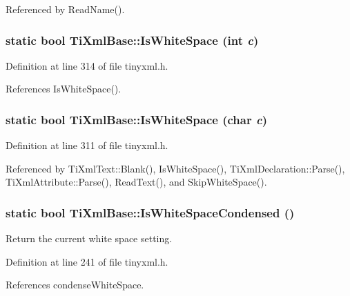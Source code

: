 Referenced by ReadName().\hypertarget{class_ti_xml_base_a3de391ea9f4c4a8aa10d04480b048795}{
\subsubsection[{IsWhiteSpace}]{\setlength{\rightskip}{0pt plus 5cm}static bool TiXmlBase::IsWhiteSpace (int {\em c})}}
\label{class_ti_xml_base_a3de391ea9f4c4a8aa10d04480b048795}


Definition at line 314 of file tinyxml.h.

References IsWhiteSpace().\hypertarget{class_ti_xml_base_af56296d561c0bab4bc8e198cdcf5c48e}{
\subsubsection[{IsWhiteSpace}]{\setlength{\rightskip}{0pt plus 5cm}static bool TiXmlBase::IsWhiteSpace (char {\em c})}}
\label{class_ti_xml_base_af56296d561c0bab4bc8e198cdcf5c48e}


Definition at line 311 of file tinyxml.h.

Referenced by TiXmlText::Blank(), IsWhiteSpace(), TiXmlDeclaration::Parse(), TiXmlAttribute::Parse(), ReadText(), and SkipWhiteSpace().\hypertarget{class_ti_xml_base_ad4b1472531c647a25b1840a87ae42438}{
\subsubsection[{IsWhiteSpaceCondensed}]{\setlength{\rightskip}{0pt plus 5cm}static bool TiXmlBase::IsWhiteSpaceCondensed ()}}
\label{class_ti_xml_base_ad4b1472531c647a25b1840a87ae42438}


Return the current white space setting. 

Definition at line 241 of file tinyxml.h.

References condenseWhiteSpace.

